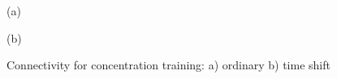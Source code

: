 \begin{figure}[h!]
\begin{minipage}[h]{0.49\linewidth}
 (a) \\
\end{minipage}
\hfill
\begin{minipage}[h]{0.5\linewidth}
 (b) \\
\end{minipage}
\caption{Connectivity for concentration training: a) ordinary b) time shift} 
\end{figure}


